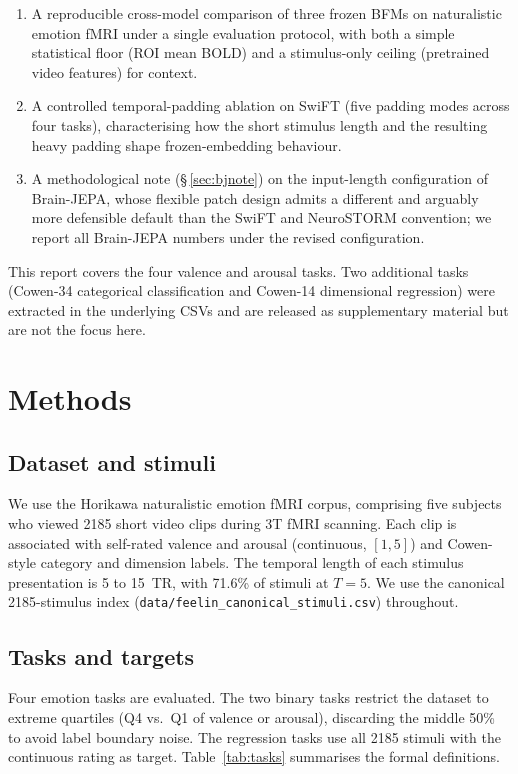 \documentclass[11pt, a4paper]{article}
\newcommand{\fefn}[1]{\texttt{\small #1}}
\begin{document}
\begin{enumerate}[leftmargin=1.4em, itemsep=2pt]
  \item A reproducible cross-model comparison of three frozen BFMs on naturalistic
        emotion fMRI under a single evaluation protocol, with both a simple statistical
        floor (ROI mean BOLD) and a stimulus-only ceiling (pretrained video features) for
        context.
  \item A controlled temporal-padding ablation on SwiFT (five padding modes across four
        tasks), characterising how the short stimulus length and the resulting heavy
        padding shape frozen-embedding behaviour.
  \item A methodological note (\S\,\ref{sec:bjnote}) on the input-length configuration of
        Brain-JEPA, whose flexible patch design admits a different and arguably more
        defensible default than the SwiFT and NeuroSTORM convention; we report all
        Brain-JEPA numbers under the revised configuration.
\end{enumerate}

This report covers the four valence and arousal tasks. Two additional tasks (Cowen-34
categorical classification and Cowen-14 dimensional regression) were extracted in the
underlying CSVs and are released as supplementary material but are not the focus here.

\section{Methods}

\subsection{Dataset and stimuli}
We use the Horikawa naturalistic emotion fMRI corpus, comprising five subjects who viewed
2185 short video clips during 3T fMRI scanning. Each clip is associated with self-rated
valence and arousal (continuous, $[1, 5]$) and Cowen-style category and dimension labels.
The temporal length of each stimulus presentation is 5 to 15~TR, with 71.6\% of stimuli at
$T = 5$. We use the canonical 2185-stimulus index
(\fefn{data/feelin\_canonical\_stimuli.csv}) throughout.

\subsection{Tasks and targets}
Four emotion tasks are evaluated. The two binary tasks restrict the dataset to extreme
quartiles (Q4 vs.\ Q1 of valence or arousal), discarding the middle 50\% to avoid label
boundary noise. The regression tasks use all 2185 stimuli with the continuous rating as
target. Table~\ref{tab:tasks} summarises the formal definitions.
\end{document}
